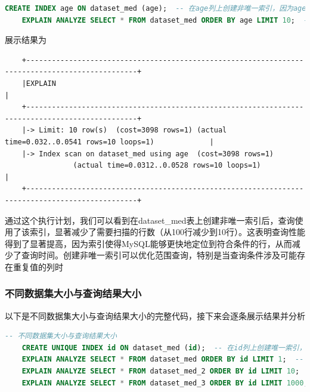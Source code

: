 \documentclass{article}
\begin{document}
	\begin{lstlisting}[language=sql, title=非唯一索引范围查询, tabsize=4]
	CREATE INDEX age ON dataset_med (age);  -- 在age列上创建非唯一索引，因为age列中可能存在重复值。
	EXPLAIN ANALYZE SELECT * FROM dataset_med ORDER BY age LIMIT 10;  -- 非唯一索引
	\end{lstlisting}
	
	展示结果为
	
	\begin{verbatim}
	+------------------------------------------------------------------------------------------------+
	|EXPLAIN                                                                                         |
	+------------------------------------------------------------------------------------------------+
	|-> Limit: 10 row(s)  (cost=3098 rows=1) (actual time=0.032..0.0541 rows=10 loops=1)             |
	|-> Index scan on dataset_med using age  (cost=3098 rows=1)
	            (actual time=0.0312..0.0528 rows=10 loops=1)                                         |
	+------------------------------------------------------------------------------------------------+
	\end{verbatim}
	
	通过这个执行计划，我们可以看到在dataset\_med表上创建非唯一索引后，查询使用了该索引，显著减少了需要扫描的行数（从100行减少到10行）。这表明查询性能得到了显著提高，因为索引使得MySQL能够更快地定位到符合条件的行，从而减少了查询时间。创建非唯一索引可以优化范围查询，特别是当查询条件涉及可能存在重复值的列时
	
	\subsubsection{不同数据集大小与查询结果大小}
	
	以下是不同数据集大小与查询结果大小的完整代码，接下来会逐条展示结果并分析
	
	\begin{lstlisting}[language=sql, title=不同数据集大小与查询结果大小, tabsize=4]
	-- 不同数据集大小与查询结果大小
	CREATE UNIQUE INDEX id ON dataset_med (id);  -- 在id列上创建唯一索引，因为id列中的每个值都是唯一的。
	EXPLAIN ANALYZE SELECT * FROM dataset_med ORDER BY id LIMIT 1;  -- 数据集规模100，查询单条结果
	EXPLAIN ANALYZE SELECT * FROM dataset_med_2 ORDER BY id LIMIT 10;  -- 数据集规模10,000，查询少量结果
	EXPLAIN ANALYZE SELECT * FROM dataset_med_3 ORDER BY id LIMIT 1000;  -- 数据集规模1,000,000，查询大量结果
	\end{lstlisting}
	
\end{document}
